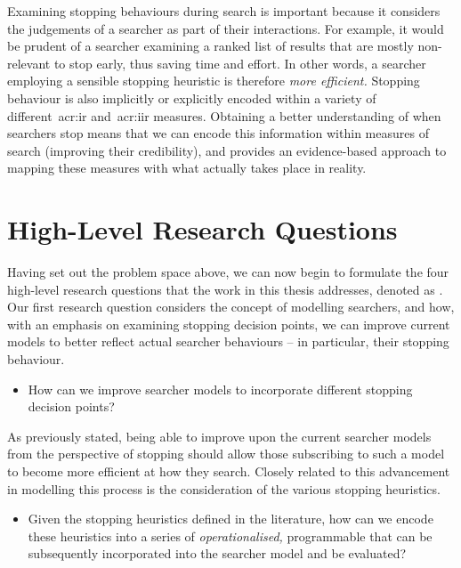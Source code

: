 Examining stopping behaviours during search is important because it considers the judgements of a searcher as part of their interactions. For example, it would be prudent of a searcher examining a ranked list of results that are mostly non-relevant to stop early, thus saving time and effort. In other words, a searcher employing a sensible stopping heuristic is therefore \emph{more efficient.} Stopping behaviour is also implicitly or explicitly encoded within a variety of different~\gls{acr:ir} and~\gls{acr:iir} measures. Obtaining a better understanding of when searchers stop means that we can encode this information within measures of search (improving their credibility), and provides an evidence-based approach to mapping these measures with what actually takes place in reality.

\section{High-Level Research Questions}\label{sec:intro:rqs}
Having set out the problem space above, we can now begin to formulate the four high-level research questions that the work in this thesis addresses, denoted as . Our first research question considers the concept of modelling searchers, and how, with an emphasis on examining stopping decision points, we can improve current models to better reflect actual searcher behaviours -- in particular, their stopping behaviour.

\begin{itemize}
    \item{ How can we improve searcher models to incorporate different stopping decision points?}
\end{itemize}

As previously stated, being able to improve upon the current searcher models from the perspective of stopping should allow those subscribing to such a model to become more efficient at how they search. Closely related to this advancement in modelling this process is the consideration of the various stopping heuristics.

\begin{itemize}
    \item{ Given the stopping heuristics defined in the literature, how can we encode these heuristics into a series of \emph{operationalised,} programmable  that can be subsequently incorporated into the searcher model and be evaluated?}
\end{itemize}


